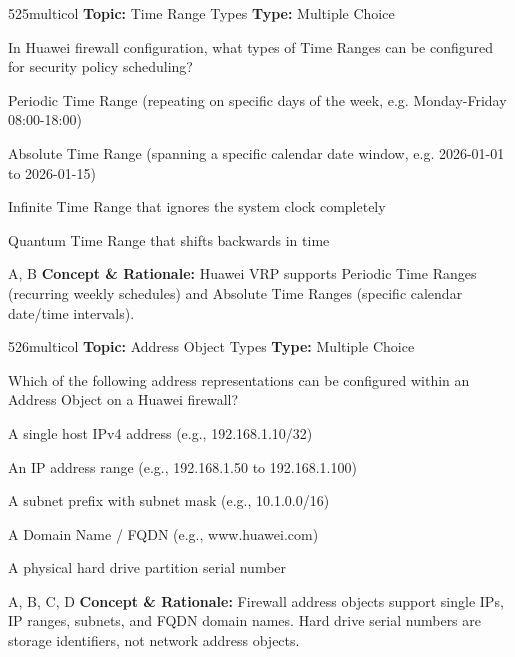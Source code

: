 \begin{qcard}{525}{multicol}
\textcolor{darkslate!75}{\small\textbf{Topic:} Time Range Types \hfill \textbf{Type:} Multiple Choice}\vspace{0.4em}\par
In Huawei firewall configuration, what types of Time Ranges can be configured for security policy scheduling?
\begin{qoptions}
\item Periodic Time Range (repeating on specific days of the week, e.g. Monday-Friday 08:00-18:00)
\item Absolute Time Range (spanning a specific calendar date window, e.g. 2026-01-01 to 2026-01-15)
\item Infinite Time Range that ignores the system clock completely
\item Quantum Time Range that shifts backwards in time
\end{qoptions}
\end{qcard}
\nopagebreak
\begin{explainbox}{A, B}
\textbf{Concept \& Rationale:} Huawei VRP supports Periodic Time Ranges (recurring weekly schedules) and Absolute Time Ranges (specific calendar date/time intervals).
\end{explainbox}

\begin{qcard}{526}{multicol}
\textcolor{darkslate!75}{\small\textbf{Topic:} Address Object Types \hfill \textbf{Type:} Multiple Choice}\vspace{0.4em}\par
Which of the following address representations can be configured within an Address Object on a Huawei firewall?
\begin{qoptions}
\item A single host IPv4 address (e.g., 192.168.1.10/32)
\item An IP address range (e.g., 192.168.1.50 to 192.168.1.100)
\item A subnet prefix with subnet mask (e.g., 10.1.0.0/16)
\item A Domain Name / FQDN (e.g., www.huawei.com)
\item A physical hard drive partition serial number
\end{qoptions}
\end{qcard}
\nopagebreak
\begin{explainbox}{A, B, C, D}
\textbf{Concept \& Rationale:} Firewall address objects support single IPs, IP ranges, subnets, and FQDN domain names. Hard drive serial numbers are storage identifiers, not network address objects.
\end{explainbox}

